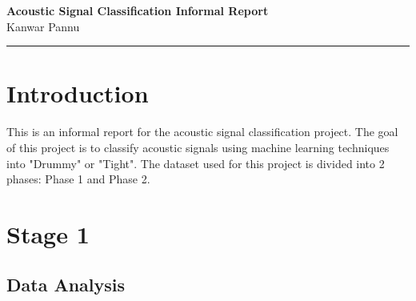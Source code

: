 \documentclass{article}
\begin{document}
\begin{centering}
\Large\textbf{\sc Acoustic Signal Classification Informal Report}\\[0.5ex]
{Kanwar Pannu}\\
\vspace{0.1in}
\end{centering}
\hrule
\vspace{0.1in}



\section{Introduction}
This is an informal report for the acoustic signal classification project. The goal of this project is to classify acoustic signals using machine learning techniques into "Drummy" or "Tight". The dataset used for this project is divided into 2 phases: Phase 1 and Phase 2.

\section{Stage 1}
\subsection{Data Analysis}
\end{document}

